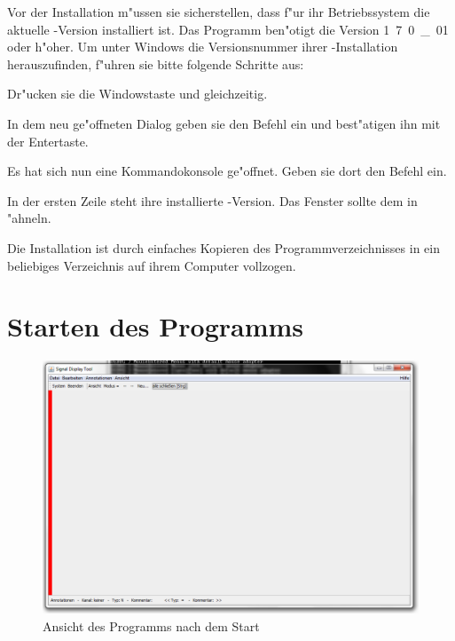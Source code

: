 Vor der Installation m"ussen sie sicherstellen, dass f"ur ihr Betriebssystem die aktuelle \javaNS-Version installiert ist.
Das Programm ben"otigt die Version \unit{1.7.0\_01} oder h"oher.
Um unter Windows die Versionsnummer ihrer \javaNS-Installation herauszufinden, f"uhren sie bitte folgende Schritte aus:
\begin{enumerate}
	{%
	\renewcommand{\theenumi}{\arabic{enumi}}
	\renewcommand{\labelenumi}{{\theenumi}.}
	\item Dr"ucken sie die Windowstaste und  gleichzeitig.
	\item In dem neu ge"offneten Dialog geben sie den Befehl  ein und best"atigen ihn mit der Entertaste.
	\item Es hat sich nun eine Kommandokonsole ge"offnet. Geben sie dort den Befehl  ein.
	\item In der ersten Zeile steht ihre installierte \javaNS-Version. Das Fenster sollte dem in  "ahneln.
	}
\end{enumerate}
Die Installation ist durch einfaches Kopieren des Programmverzeichnisses in ein beliebiges Verzeichnis auf ihrem Computer vollzogen.

\section{Starten des Programms}

\begin{figure}[htb]
\centering
\includegraphics[width=\textwidth]{bilder/window.png}
\caption{Ansicht des Programms nach dem Start}
\label{pic:program_start}
\end{figure}

